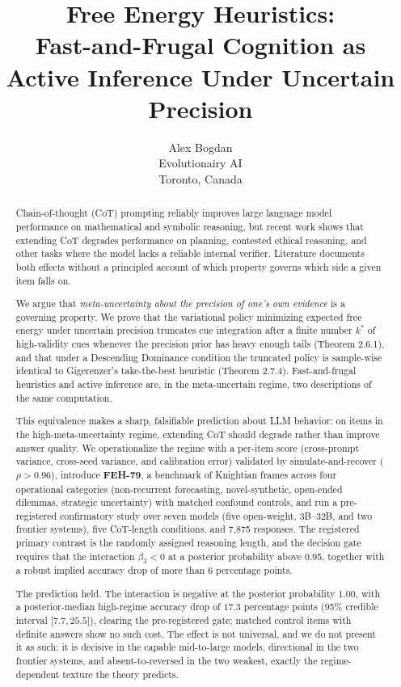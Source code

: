 \documentclass{article}
\title{Free Energy Heuristics:\\ Fast-and-Frugal Cognition as Active Inference Under Uncertain Precision}
\author{
    Alex Bogdan \\
    Evolutionairy AI \\
    Toronto, Canada \\
  }
\begin{document}
\maketitle

\begin{abstract}
Chain-of-thought (CoT) prompting reliably improves large language model
performance on mathematical and symbolic reasoning, but recent work
shows that extending CoT degrades performance on planning, contested
ethical reasoning, and other tasks where the model lacks a reliable
internal verifier. Literature documents both effects without a
principled account of which property governs which side a given item
falls on.

We argue that \emph{meta-uncertainty about the precision of one's own
evidence} is a governing property. We prove that the variational policy
minimizing expected free energy under uncertain precision truncates cue
integration after a finite number \(k^{*}\) of high-validity cues
whenever the precision prior has heavy enough tails (Theorem 2.6.1), and
that under a Descending Dominance condition the truncated policy is
sample-wise identical to Gigerenzer's take-the-best heuristic (Theorem
2.7.4). Fast-and-frugal heuristics and active inference are, in the
meta-uncertain regime, two descriptions of the same computation.

This equivalence makes a sharp, falsifiable prediction about LLM
behavior: on items in the high-meta-uncertainty regime, extending CoT
should degrade rather than improve answer quality. We operationalize the
regime with a per-item score (cross-prompt variance, cross-seed
variance, and calibration error) validated by simulate-and-recover
(\(\rho > 0.96\)), introduce \textbf{FEH-79}, a benchmark of Knightian
frames across four operational categories (non-recurrent forecasting,
novel-synthetic, open-ended dilemmas, strategic uncertainty) with
matched confound controls, and run a pre-registered confirmatory study
over seven models (five open-weight, 3B--32B, and two frontier systems),
five CoT-length conditions, and 7,875 responses. The registered primary
contrast is the randomly assigned reasoning length, and the decision
gate requires that the interaction \(\beta_{3} < 0\) at a posterior
probability above 0.95, together with a robust implied accuracy drop of
more than 6 percentage points.

The prediction held. The interaction is negative at the posterior
probability \(1.00\), with a posterior-median high-regime accuracy drop
of \(17.3\) percentage points (95\% credible interval
\(\lbrack 7.7,25.5\rbrack\)), clearing the pre-registered gate; matched
control items with definite answers show no such cost. The effect is not
universal, and we do not present it as such: it is decisive in the
capable mid-to-large models, directional in the two frontier systems,
and absent-to-reversed in the two weakest, exactly the regime-dependent
texture the theory predicts.


\end{abstract}
\end{document}

